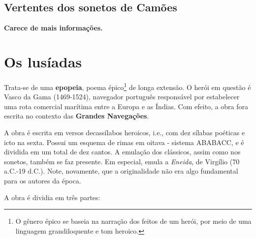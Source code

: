 \documentclass[12pt]{book}
\begin{document}
 				\subsection{Vertentes dos sonetos de Camões}
 				\par \textbf{Carece de mais informações.}
 			\section{Os lusíadas}
 			\par Trata-se de uma \textbf{epopeia}, poema épico\footnote{O gênero épico se baseia na narração dos feitos de um herói, por meio de uma linguagem grandiloquente e tom heroico.} de longa extensão. O herói em questão é Vasco da Gama (1469-1524), navegador português responsável por estabelecer uma rota comercial marítima entre a Europa e as Índias. Com efeito, a obra fora escrita no contexto das \textbf{Grandes Navegações}. 
 			\par A obra é escrita em versos decassílabos heroicos, i.e., com dez sílabas poéticas e icto na sexta. Possui um esquema de rimas em oitava - sistema ABABACC, e é dividida em um total de dez cantos. A emulação dos clássicos, assim como nos sonetos, também se faz presente. Em especial, emula a \textit{Eneida}, de Virgílio (70 a.C.-19 d.C.). Note, novamente, que a originalidade não era algo fundamental para os autores da época.
 			\par A obra é dividia em três partes:
\end{document}
